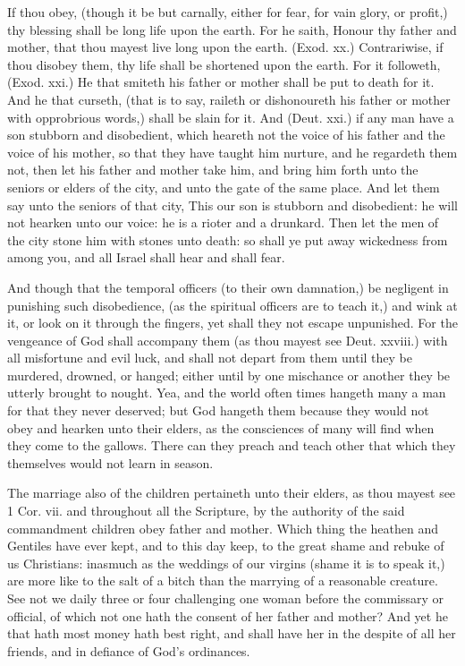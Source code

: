 If thou obey, (though it be but carnally, either for fear,
for vain glory, or profit,) thy blessing shall be long life 
upon the earth. For he saith, Honour thy father and 
mother, that thou mayest live long upon the earth. (Exod. 
xx.) Contrariwise, if thou disobey them, thy life shall 
be shortened upon the earth. For it followeth, (Exod. xxi.) 
He that smiteth his father or mother shall be put to death 
for it. And he that curseth, (that is to say, raileth or dishonoureth
his father or mother with opprobrious words,) 
shall be slain for it. And (Deut. xxi.) if any man have 
a son stubborn and disobedient, which heareth not the 
voice of his father and the voice of his mother, so that 
they have taught him nurture, and he regardeth them not, 
then let his father and mother take him, and bring him 
forth unto the seniors or elders of the city, and unto the 
gate of the same place. And let them say unto the 
seniors of that city, This our son is stubborn and disobedient:
he will not hearken unto our voice: he is a rioter 
and a drunkard. Then let the men of the city stone him 
with stones unto death: so shall ye put away wickedness
from among you, and all Israel shall hear and shall fear. 

And though that the temporal officers (to their own 
damnation,) be negligent in punishing such disobedience, 
(as the spiritual officers are to teach it,) and wink at it, 
or look on it through the fingers, yet shall they not escape 
unpunished. For the vengeance of God shall accompany 
them (as thou mayest see Deut. xxviii.) with all misfortune
and evil luck, and shall not depart from them until 
they be murdered, drowned, or hanged; either until by 
one mischance or another they be utterly brought to 
nought. Yea, and the world often times hangeth many a 
man for that they never deserved; but God hangeth them 
because they would not obey and hearken unto their 
elders, as the consciences of many will find when they 
come to the gallows. There can they preach and teach 
other that which they themselves would not learn in 
season. 

The marriage also of the children pertaineth unto their 
elders, as thou mayest see 1 Cor. vii. and throughout all 
the Scripture, by the authority of the said commandment
children obey father and mother. Which thing the 
heathen and Gentiles have ever kept, and to this day keep, 
to the great shame and rebuke of us Christians: inasmuch
as the weddings of our virgins (shame it is to speak 
it,) are more like to the salt of a bitch than the marrying
of a reasonable creature. See not we daily three or 
four challenging one woman before the commissary or 
official, of which not one hath the consent of her father and 
mother? And yet he that hath most money hath best 
right, and shall have her in the despite of all her friends, 
and in defiance of God's ordinances. 

